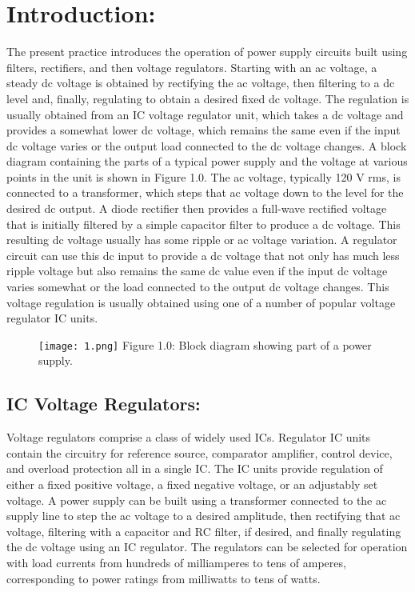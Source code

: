 \section{Introduction:}

The present practice introduces the operation of power supply circuits built using filters, rectifiers, and then voltage regulators. Starting with an ac voltage, a steady dc voltage is obtained by rectifying the ac voltage, then filtering to a dc level and, finally, regulating to obtain a desired fixed dc voltage. The regulation is usually obtained from an IC voltage regulator unit, which takes a dc voltage and provides a somewhat lower dc voltage, which remains the same even if the input dc voltage varies or the output load connected to the dc voltage changes. A block diagram containing the parts of a typical power supply and the voltage at various points in the unit is shown in Figure 1.0. The ac voltage, typically 120 V rms, is connected to a transformer, which steps that ac voltage down to the level for the desired dc output. A diode rectifier then provides a full-wave rectified voltage that is initially filtered by a simple capacitor filter to produce a dc voltage. This resulting dc voltage usually has some ripple or ac voltage variation. A regulator circuit can use this dc input to provide a dc voltage that not only has much less ripple voltage but also remains the same dc value even if the input dc voltage varies somewhat or the load connected to the output dc voltage changes. This voltage regulation is usually obtained using one of a number of popular voltage regulator IC units.

\begin{figure}[H]
\texttt{[image: 1.png]}
\centering \linebreak \linebreak Figure 1.0: Block diagram showing part of a power supply.
\end{figure}

\subsection{IC Voltage Regulators:}

Voltage regulators comprise a class of widely used ICs. Regulator IC units contain the circuitry for reference source, comparator amplifier, control device, and overload protection all in a single IC. The IC units provide regulation of either a fixed positive voltage, a fixed negative voltage, or an adjustably set voltage. A power supply can be built using a transformer connected to the ac supply line to step the ac voltage to a desired amplitude, then rectifying that ac voltage, filtering with a capacitor and RC filter, if desired, and finally regulating the dc voltage using an IC regulator. The regulators can be selected for operation with load currents from hundreds of milliamperes to tens of amperes, corresponding to power ratings from milliwatts to tens of watts.

